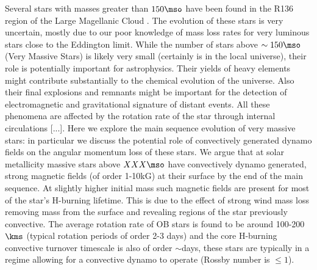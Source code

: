 Several stars with masses greater than $150\mso$ have been found in the R136 region of the Large Magellanic Cloud  \cite{sof_Parker_Goodwin_Kassim_2010}. The evolution of these stars is very uncertain, mostly due to our poor knowledge of mass loss rates for very luminous stars close to the Eddington limit. While the number of stars above $\sim 150\mso$ (Very Massive Stars) is likely very small (certainly is in the local universe), their role is potentially important for astrophysics. Their yields of heavy elements might contribute substantially to the chemical evolution of the universe. Also their final explosions and remnants might be important for the detection of electromagnetic and gravitational signature of distant events. All these phenomena are affected by the rotation rate of the star through internal circulations [...]. Here we explore the main sequence evolution of very massive stars: in particular we discuss the potential role of convectively generated dynamo fields on the angular momentum loss of these stars. We argue that at solar metallicity massive stars above $XXX\mso$ have convectively dynamo generated, strong magnetic fields (of order 1-10kG) at their surface by the end of the main sequence. At slightly higher initial mass such magnetic fields are present for most of the star's H-burning lifetime. This is due to the effect of strong wind mass loss removing mass from the surface and revealing regions of the star previously convective. The average rotation rate of OB stars is found to be around 100-200$\kms$ (typical rotation periods of order 2-3 days) and the core H-burning convective turnover timescale is also of order $\sim$days, these stars are typically in a regime allowing for a convective dynamo to operate (Rossby number is $\le 1$).